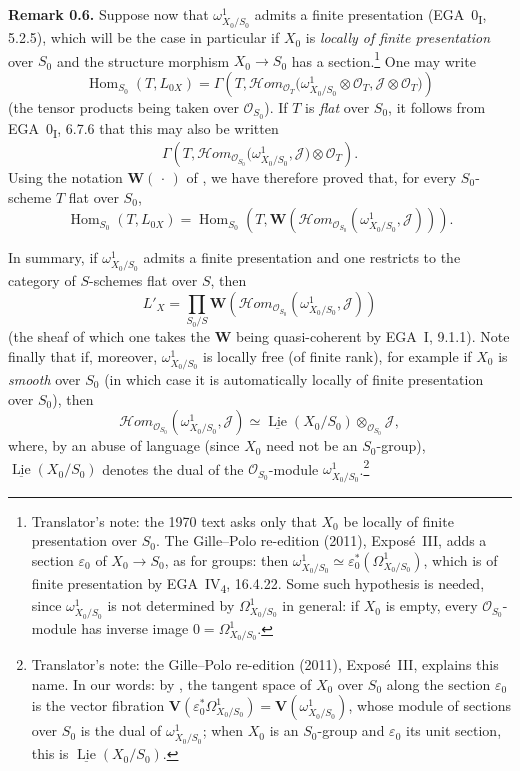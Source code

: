 \medskip
\noindent{}\textbf{Remark 0.6.}
Suppose now that \(\omega^1_{X_0/S_0}\) admits a finite presentation
(EGA~0\textsubscript{I}, 5.2.5), which will be the case in particular if
\(X_0\) is \emph{locally of finite presentation} over \(S_0\) and the
structure morphism \(X_0\to S_0\) has a section.\footnote{Translator's note:
the 1970 text asks only that \(X_0\) be locally of finite presentation over
\(S_0\). The Gille--Polo re-edition (2011), Exposé~III, adds a section
\(\varepsilon_0\) of \(X_0\to S_0\), as for groups: then
\(\omega^1_{X_0/S_0}\simeq\varepsilon_0^*(\Omega^1_{X_0/S_0})\), which is of
finite presentation by EGA~IV\textsubscript{4}, 16.4.22. Some such hypothesis
is needed, since \(\omega^1_{X_0/S_0}\) is not determined by
\(\Omega^1_{X_0/S_0}\) in general: if \(X_0\) is empty, every
\(\mathscr O_{S_0}\)-module has inverse image \(0=\Omega^1_{X_0/S_0}\).} One
may write
\[
 \operatorname{Hom}_{S_0}(T,L_{0X})
 =
 \Gamma\!\left(
   T,
   \mathscr{H}om_{\mathscr O_T}
   \bigl(\omega^1_{X_0/S_0}\otimes\mathscr O_T,
         \mathscr J\otimes\mathscr O_T\bigr)
 \right)
\]
(the tensor products being taken over \(\mathscr O_{S_0}\)). If \(T\) is
\emph{flat} over \(S_0\), it follows from EGA~0\textsubscript{I}, 6.7.6 that
this may also be written
\[
 \Gamma\!\left(
   T,
   \mathscr{H}om_{\mathscr O_{S_0}}
   \bigl(\omega^1_{X_0/S_0},\mathscr J\bigr)
   \otimes\mathscr O_T
 \right).
\]
Using the notation \(\mathbf W(\,\cdot\,)\) of , we have
therefore proved that, for every \(S_0\)-scheme \(T\) flat over
\(S_0\),
\[
 \operatorname{Hom}_{S_0}(T,L_{0X})
 =
 \operatorname{Hom}_{S_0}
 \left(T,
 \mathbf W\!\left(
   \mathscr{H}om_{\mathscr O_{S_0}}
   (\omega^1_{X_0/S_0},\mathscr J)
 \right)\right).
\]

In summary, if \(\omega^1_{X_0/S_0}\) admits a finite presentation
and one restricts to the category of \(S\)-schemes flat over \(S\),
then
\[
 L'_X
 =
 \prod_{S_0/S}
 \mathbf W\!\left(
   \mathscr{H}om_{\mathscr O_{S_0}}
   (\omega^1_{X_0/S_0},\mathscr J)
 \right)
\]
(the sheaf of which one takes the \(\mathbf W\) being quasi-coherent by
EGA~I, 9.1.1). Note finally that if, moreover, \(\omega^1_{X_0/S_0}\) is locally free
(of finite rank), for example if \(X_0\) is \emph{smooth} over \(S_0\) (in
which case it is automatically locally of finite presentation over
\(S_0\)), then
\[
 \mathscr{H}om_{\mathscr O_{S_0}}
   (\omega^1_{X_0/S_0},\mathscr J)
 \simeq
 \underline{\operatorname{Lie}}(X_0/S_0)
 \otimes_{\mathscr O_{S_0}}\mathscr J,
\]
where, by an abuse of language (since \(X_0\) need not be an
\(S_0\)-group),
\(\underline{\operatorname{Lie}}(X_0/S_0)\) denotes the dual of the
\(\mathscr O_{S_0}\)-module \(\omega^1_{X_0/S_0}\).\footnote{Translator's note: the Gille--Polo re-edition (2011), Exposé~III,
explains this name. In our words: by , the
tangent space of \(X_0\) over \(S_0\) along the section \(\varepsilon_0\) is
the vector fibration
\(\mathbf V(\varepsilon_0^*\Omega^1_{X_0/S_0})=\mathbf V(\omega^1_{X_0/S_0})\),
whose module of sections over \(S_0\) is the dual of
\(\omega^1_{X_0/S_0}\); when \(X_0\) is an \(S_0\)-group and
\(\varepsilon_0\) its unit section, this is
\(\underline{\operatorname{Lie}}(X_0/S_0)\).}

